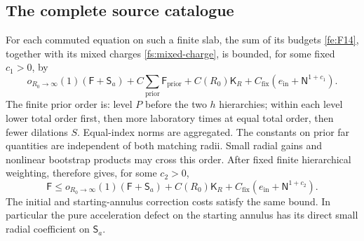 \subsection{The complete source catalogue}
\begin{proposition}
\label{fs:source-estimate}
For each commuted equation on such a finite slab, the sum of its
budgets \eqref{fe:F14}, together with its mixed charges
\eqref{fs:mixed-charge}, is bounded, for some fixed $c_1>0$, by
\begin{equation}
\label{fs:F15}
 o_{R_0\to\infty}(1)(\mathsf F+\mathsf S_a)
 +C\sum_{\mathrm{prior}}\mathsf F_{\mathrm{prior}}
 +C(R_0)\mathsf K_R
 +C_{\mathrm{fix}}(e_{\mathrm{in}}+\mathsf N^{1+c_1}).
\end{equation}
The finite prior order is: level $P$ before the two $h$ hierarchies;
within each level lower total order first, then more laboratory times
at equal total order, then fewer dilations $S$.  Equal-index norms are
aggregated.  The constants on prior far quantities are independent of
both matching radii.  Small radial gains and nonlinear bootstrap
products may cross this order.  After fixed finite hierarchical
weighting,  therefore gives, for some $c_2>0$,
\begin{equation}
\label{fs:F}
 \mathsf F\le o_{R_0\to\infty}(1)(\mathsf F+\mathsf S_a)
 +C(R_0)\mathsf K_R
 +C_{\mathrm{fix}}(e_{\mathrm{in}}+\mathsf N^{1+c_2}).
\end{equation}
The initial and starting-annulus correction costs satisfy the same
bound.  In particular the pure acceleration defect on the starting
annulus has its direct small radial coefficient on $\mathsf S_a$.
\end{proposition}


